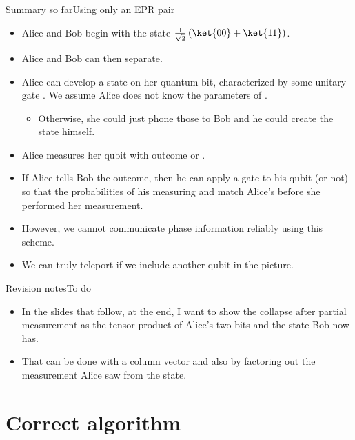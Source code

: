 \begin{frame}{Summary so far}{Using only an EPR pair}

\begin{itemize}[<+->]
    \item Alice and Bob begin with the state $\RootTwo{}\left(\ket{00}+\ket{11}\right)$.
    \item Alice and Bob can then separate.
    \item Alice can develop a state on her quantum bit, characterized by some unitary gate .  We assume Alice does not know the parameters of .
    \begin{itemize}
        \item Otherwise, she could just phone those to Bob and he could create the state himself.
    \end{itemize}
    \item Alice measures her qubit with outcome  or .
    \item If Alice tells Bob the outcome, then he can apply a gate to his qubit (or not) so that the probabilities of his measuring  and  match Alice's before she performed her measurement.
    \item However, we cannot communicate phase information reliably using this scheme.
    \item We can truly teleport if we include another qubit in the picture.
\end{itemize}

\end{frame}

\begin{frame}{Revision notes}{To do}

\begin{itemize}
    \item In the slides that follow, at the end, I want to show the collapse after partial measurement as the tensor product of Alice's two bits and the state Bob now has.
    \item That can be done with a column vector and also by factoring out the measurement Alice saw from the state.
\end{itemize}
    
\end{frame}

\section*{Correct algorithm}

